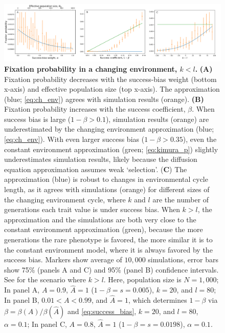 \documentclass[12pt]{extarticle}
\begin{document}
\begin{figure}[H]
	\centering
    \includegraphics[width=\linewidth]{ch_env.pdf}
  \caption{\textbf{Fixation probability in a changing environment, $k<l$.}
\textbf{(A)} Fixation probability decreases with {the} success-bias weight (bottom x-axis) and effective population size (top x-axis). The approximation (blue; \cref{eq:ch_env}) agrees with simulation results (orange). 
\textbf{(B)} Fixation probability increases with the success coefficient, $\beta$.
When success bias is large ($1-\beta > 0.1$),  
simulation results (orange) are underestimated by the changing environment approximation (blue; \cref{eq:ch_env}). With even larger success bias ($1-\beta > 0.35$), even the constant environment approximation (green; \cref{eq:kimura_p}) slightly underestimates simulation results, likely because the diffusion equation approximation assumes weak `selection'.
(\textbf{C}) The approximation (blue) is robust to changes in environmental cycle length, as it agrees with simulations (orange) for different sizes of the changing environment cycle, where $k$ and $l$ are the number of generations each trait value is under success bias. 
When $k>l$, the approximation and the simulations are both very close to the constant environment approximation (green), because the more generations the rare phenotype is favored, the more similar it is to the constant environment model, where it is always favored by the success bias.
Markers show average of $10,000$ simulations, error bars show 75\% (panels A and C) and 95\% (panel B) confidence intervals.
See  for the scenario where $k>l$.
Here, population size is $N=1,000$;
In panel A, $A=0.9$, $\hat{A}=1$ ($1-\beta=s=0.005$), $k=20$, and $l=80$;
In panel B, $0.01 < A< 0.99$, and $\hat{A}=1$, which determines $1-\beta$ via $\beta = \beta(A)/\beta(\hat{A})$ and \cref{eq:success_bias}, $k=20$, and $l=80$, $\alpha=0.1$; 
In panel C, $A=0.8$, $\hat{A}=1$ ($1-\beta=s=0.0198$), $\alpha=0.1$.
}
\label{fig:ch_env_alpha_beta}
\end{figure}


\end{document}
